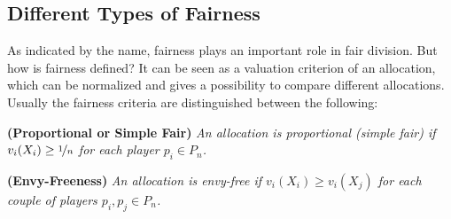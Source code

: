 \subsection{Different Types of Fairness}
As indicated by the name, fairness plays an important role in fair division. But how is fairness defined? It can be seen as a valuation criterion of an allocation, which can be normalized and gives a possibility to compare different allocations. Usually the fairness criteria are distinguished between the following:
\begin{defi}{\textbf{(Proportional or Simple Fair)}}
\newline \emph{An allocation is \emph{proportional (simple fair)} if
$v_i(X_i) \geq \nicefrac{1}{n}$ for each player $p_i \in P_n$.}
\end{defi}
\begin{defi}{\textbf{(Envy-Freeness)}}
\newline \emph{An allocation is \emph{envy-free} if $v_i(X_i) \geq
v_i(X_j)$ for each couple of players $p_i, p_j \in P_n$.}
\end{defi}
\vsp
%

